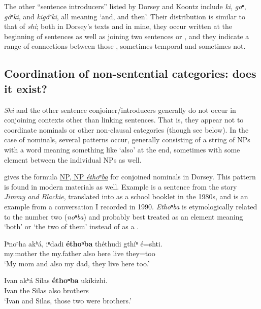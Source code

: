 \documentclass[output=paper]{LSP/langsci}
\begin{document}
The other ``sentence introducers'' listed by Dorsey and Koontz include \textit{ki}, \textit{goⁿ}, \textit{góⁿki}, and \textit{kigóⁿki}, all meaning `and, and then'. Their distribution is similar to that of \textit{shi}; both in Dorsey's texts and in mine, they occur written at the beginning of sentences as well as joining two sentences or , and they indicate a range of connections between those , sometimes temporal and sometimes not. 

\subsection{Coordination of non-sentential categories: does it exist?}

\textit{Shi} and the other sentence conjoiner/introducers generally do not occur in conjoining contexts other than linking sentences. That is, they appear not to coordinate nominals or other non-clausal categories (though see  below).  In the case of nominals, several patterns occur, generally consisting of a string of NPs with a word meaning something like `also' at the end, sometimes with some element between the individual NPs as well.  

\citet[201]{Koontz1984} gives the formula \underline{NP, NP \textit{éthoⁿba}} for conjoined nominals in Dorsey.  This pattern is found in modern materials as well.  Example  is a sentence from the story \textit{Jimmy and Blackie}, translated into  as a school booklet in the 1980s, and  is an example from a conversation I recorded in 1990. \textit{Ethoⁿba} is etymologically related to the number two (\textit{noⁿba}) and probably best treated as an element meaning `both' or `the two of them' instead of as a .

\begin{exe}
\ex\label{ex:rudin:12} 
\gll  Iⁿnoⁿha  	akʰá, iⁿdadi    \textbf{éthoⁿba} 	théthudi 	gthíⁿ 	é=shti.  \\
	my.mother 	the  	my.father 	also        	here       	live   	they=too\\
\trans `My mom and also my dad, they live here too.'

\ex\label{ex:rudin:13} 
\gll  Ivan 	akʰá Silas 	\textbf{éthoⁿba} ukíkizhi. \\         
Ivan the   Silas	 also       	brothers\\
\trans`Ivan and Silas, those two were brothers.'
\end{exe}
\end{document}
